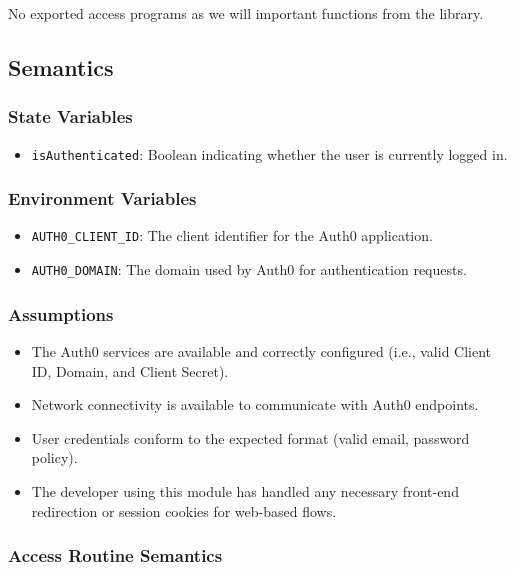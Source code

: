\documentclass[12pt, titlepage]{article}
\begin{document}
No exported access programs as we will important functions from the library.

\subsection{Semantics}

\subsubsection{State Variables}

\begin{itemize}
    \item \texttt{isAuthenticated}: Boolean indicating whether the user is currently logged in.
\end{itemize}

\subsubsection{Environment Variables}

\begin{itemize}
  \item \texttt{AUTH0\_CLIENT\_ID}: The client identifier for the Auth0 application.
  \item \texttt{AUTH0\_DOMAIN}: The domain used by Auth0 for authentication requests.
\end{itemize}

\subsubsection{Assumptions}

\begin{itemize}
    \item The Auth0 services are available and correctly configured (i.e., valid Client ID, Domain, and Client Secret).
    \item Network connectivity is available to communicate with Auth0 endpoints.
    \item User credentials conform to the expected format (valid email, password policy).
    \item The developer using this module has handled any necessary front-end redirection or session cookies for web-based flows.
\end{itemize}

\subsubsection{Access Routine Semantics}
\end{document}
